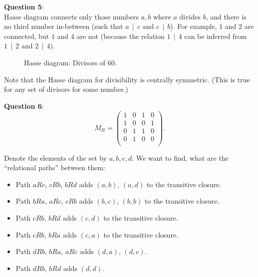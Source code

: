 \documentclass[jou]{apa6}
\begin{document}
\vspace{6pt}
{\bf Question 5}:\\
Hasse diagram connects only those numbers $a,b$ where $a$ divides $b$, and
there is no third  number in-between (such that $a\,\mid\,c$ and $c\,\mid\,b$). 
For example, $1$ and $2$ are connected, but $1$ and $4$ are not 
(because the relation $1\,\mid\,4$ can be inferred from 
$1\,\mid\,2$ and $2\,\mid\,4$).

\begin{figure}[!htb]
\caption{\label{fig:hasse-diagram-60} Hasse diagram: Divisors of 60.}
\end{figure}

Note that the Hasse diagram for divisibility is centrally symmetric. 
(This is true for any set of divisors for some number.)


\vspace{6pt}
{\bf Question 6}:\\
$$M_R  = \left( \begin{array}{cccc}
1 & 0 & 1 & 0 \\
1 & 0 & 0 & 1 \\
0 & 1 & 1 & 0 \\
0 & 1 & 0 & 0 \\
\end{array} \right).$$

Denote the elements of the set by $a,b,c,d$. We want to find, 
what are the ``relational paths'' between them:
\begin{itemize}
\item Path $aRc$, $cRb$, $bRd$ adds $(a,b)$, $(a,d)$ to the transitive closure.
\item Path $bRa$, $aRc$, $cRb$ adds $(b,c)$, $(b,b)$ to the transitive closure.
\item Path $cRb$, $bRd$ adds $(c,d)$ to the transitive closure.
\item Path $cRb$, $bRa$ adds $(c,a)$ to the transitive closure.
\item Path $dRb$, $bRa$, $aRc$ adds $(d,a)$, $(d,c)$.
\item Path $dRb$, $bRd$ adds $(d,d)$.
\end{itemize}
\end{document}
